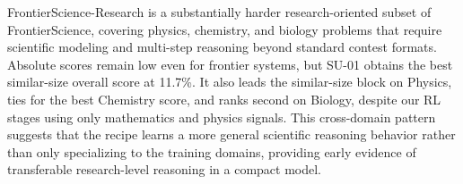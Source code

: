 FrontierScience-Research is a substantially harder research-oriented subset of
FrontierScience, covering physics, chemistry, and biology problems that require
scientific modeling and multi-step reasoning beyond standard contest formats.
Absolute scores remain low even for frontier systems, but SU-01 obtains the
best similar-size overall score at 11.7\%. It also leads the
similar-size block on Physics, ties for the best Chemistry score, and ranks
second on Biology, despite our RL stages using only mathematics and physics
signals. This cross-domain pattern suggests that the recipe learns a more
general scientific reasoning behavior rather than only specializing to the
training domains, providing early evidence of transferable research-level
reasoning in a compact model.

\begin{table}[t]
\centering
\caption{Performance on non-verifiable benchmarks. FrontierScience-Research refers to the research subset of FrontierScience. For SU-01, $x/y$ reports scores without and with TTS on ProofBench.}
\label{tab:nonverifiable-benchmarks}
\vspace{-5 pt}
\setlength{\tabcolsep}{2.4pt}
\renewcommand{\arraystretch}{1.12}
\small
{}
\end{table}
